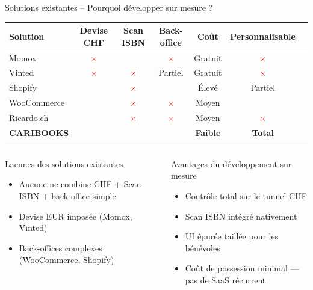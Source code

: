 \documentclass[aspectratio=169,10pt]{beamer}
\newcommand{\yes}{\textcolor{mysuccess}{\textbf{\checkmark}}}
\newcommand{\nomark}{\textcolor{red}{\textbf{$\times$}}}
\begin{document}
\begin{frame}{Solutions existantes -- Pourquoi développer sur mesure ?}
  \begin{center}
  \small
  \renewcommand{\arraystretch}{1.4}
  \begin{tabular}{@{}lcccccc@{}}
    \toprule
    \textbf{Solution} & \textbf{Devise CHF} & \textbf{Scan ISBN}
      & \textbf{Back-office} & \textbf{Coût} & \textbf{Personnali\-sable} \\
    \midrule
    Momox       & \nomark  & \yes & \nomark     & Gratuit & \nomark \\
    Vinted      & \nomark  & \nomark  & Partiel & Gratuit & \nomark \\
    Shopify     & \yes & \nomark  & \yes    & Élevé   & Partiel \\
    WooCommerce & \yes & \nomark  & \nomark     & Moyen   & \yes \\
    Ricardo.ch  & \yes & \nomark  & \nomark     & Moyen   & \nomark \\
    \midrule
    \rowcolor{mybluepale}
    \textbf{CARIBOOKS} & \textbf{\yes} & \textbf{\yes} & \textbf{\yes}
      & \textbf{Faible} & \textbf{\yes\; Total} \\
    \bottomrule
  \end{tabular}
  \end{center}
  \vspace{4pt}
  \begin{columns}[T]
    \begin{alertblock}{Lacunes des solutions existantes}
      \begin{itemize}\small
        \item Aucune ne combine CHF + Scan ISBN + back-office simple
        \item Devise EUR imposée (Momox, Vinted)
        \item Back-offices complexes (WooCommerce, Shopify)
      \end{itemize}
    \end{alertblock}
    \begin{exampleblock}{Avantages du développement sur mesure}
      \begin{itemize}\small
        \item Contrôle total sur le tunnel CHF
        \item Scan ISBN intégré nativement
        \item UI épurée taillée pour les bénévoles
        \item Coût de possession minimal --- pas de SaaS récurrent
      \end{itemize}
    \end{exampleblock}
  \end{columns}
\end{frame}
\end{document}
